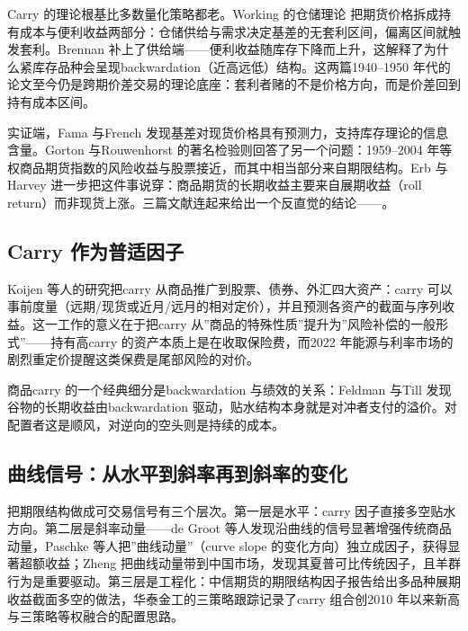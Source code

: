 \documentclass[12pt,a4paper]{ctexart}
\begin{document}
Carry 的理论根基比多数量化策略都老。Working 的仓储理论\cite{70} 把期货价格拆成持有成本与便利收益两部分：仓储供给与需求决定基差的无套利区间，偏离区间就触发套利。Brennan 补上了供给端\cite{71}——便利收益随库存下降而上升，这解释了为什么紧库存品种会呈现backwardation（近高远低）结构。这两篇1940–1950 年代的论文至今仍是跨期价差交易的理论底座：套利者赌的不是价格方向，而是价差回到持有成本区间。


实证端，Fama 与French 发现基差对现货价格具有预测力，支持库存理论的信息含量\cite{51}。Gorton 与Rouwenhorst 的著名检验则回答了另一个问题：1959–2004 年等权商品期货指数的风险收益与股票接近，而其中相当部分来自期限结构\cite{50}。Erb 与Harvey 进一步把这件事说穿：商品期货的长期收益主要来自展期收益（roll return）而非现货上涨\cite{52}。三篇文献连起来给出一个反直觉的结论——。


\subsection{Carry 作为普适因子}

Koijen 等人的研究把carry 从商品推广到股票、债券、外汇四大资产\cite{53}：carry 可以事前度量（远期/现货或近月/远月的相对定价），并且预测各资产的截面与序列收益。这一工作的意义在于把carry 从”\hspace{0.3em}商品的特殊性质”\hspace{0.3em}提升为”\hspace{0.3em}风险补偿的一般形式”——持有高carry 的资产本质上是在收取保险费，而2022 年能源与利率市场的剧烈重定价提醒这类保费是尾部风险的对价\cite{22}。


商品carry 的一个经典细分是backwardation 与绩效的关系：Feldman 与Till 发现谷物的长期收益由backwardation 驱动，贴水结构本身就是对冲者支付的溢价\cite{54}。对配置者这是顺风，对逆向的空头则是持续的成本。


\subsection{曲线信号：从水平到斜率再到斜率的变化}

把期限结构做成可交易信号有三个层次。第一层是水平：carry 因子直接多空贴水方向\cite{53, 58}。第二层是斜率动量——de Groot 等人发现沿曲线的信号显著增强传统商品动量\cite{55}，Paschke 等人把”\hspace{0.3em}曲线动量”（curve slope 的变化方向）独立成因子，获得显著超额收益\cite{56}；Zheng 把曲线动量带到中国市场，发现其夏普可比传统因子，且羊群行为是重要驱动\cite{57}。第三层是工程化：中信期货的期限结构因子报告给出多品种展期收益截面多空的做法\cite{58}，华泰金工的三策略跟踪记录了carry 组合创2010 年以来新高与三策略等权融合的配置思路\cite{59}。
\end{document}
